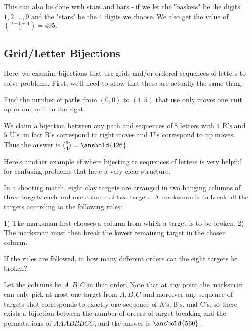 This can also be done with stars and bars - if we let the "baskets" be the digits $1,2,\ldots, 9$ and the "stars" be the 4 digits we choose. We also get the value of $\binom{9-1+4}{4}=495.$

\subsection{Grid/Letter Bijections}
Here, we examine bijections that use grids and/or ordered sequences of letters to solve problems. First, we'll need to show that these are actually the same thing.
\begin{exam}[Folklore]
Find the number of paths from $(0,0)$ to $(4,5)$ that use only moves one unit up or one unit to the right.
\end{exam}

\begin{sol}
We claim a bijection between any path and sequences of $8$ letters with $4$ R's and $5$ U's; in fact R's correspond to right moves and U's correspond to up moves. Thus the answer is $\binom 94 = \ansbold{126}$.
\end{sol}

Here's another example of where bijecting to sequences of letters is very helpful for confusing problems that have a very clear structure.
\begin{exam}[AIME 1990/8]
In a shooting match, eight clay targets are arranged in two hanging columns of three targets each and one column of two targets. A marksman is to break all the targets according to the following rules:

1) The marksman first chooses a column from which a target is to be broken.
2) The marksman must then break the lowest remaining target in the chosen column.

If the rules are followed, in how many different orders can the eight targets be broken?
\end{exam}

\begin{sol}
Let the columns be $A,B,C$ in that order. Note that at any point the marksman can only pick at most one target from $A,B,C$ and moreover any sequence of targets shot corresponds to exactly one sequence of A's, B's, and C's, so there exists a bijection between the number of orders of target breaking and the permutations of $AAABBBCC$, and the answer is $\ansbold{560}$.
\end{sol}

